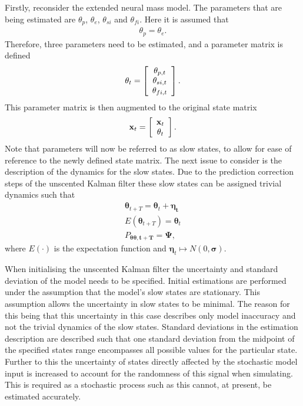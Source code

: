Firstly, reconsider the extended neural mass model. The parameters that are being estimated are $\theta_{p}$, $\theta_{e}$, $\theta_{si}$ and $\theta_{fi}$. Here it is assumed that \begin{align}
\theta_{p} = \theta_{e}.
\end{align} Therefore, three parameters need to be estimated, and a parameter matrix is defined
\[ \mathbf{\theta}_{t} = \left[ \begin{array}[pos]{c}
\theta_{p,t}\\
\theta_{si,t} \\
\theta_{fi,t} \end{array} \right] .\] This parameter matrix is then augmented to the original state matrix
\[ \mathbf{x}_{t} = \left[ \begin{array}[pos]{c}
\mathbf{x}_{t}\\
\mathbf{\theta}_{t} \end{array} \right] .\] Note that parameters will now be referred to as slow states, to allow for ease of reference to the newly defined state matrix. The next issue to consider is the description of the dynamics for the slow states. Due to the prediction correction steps of the unscented Kalman filter these slow states can be assigned trivial dynamics such that
\begin{align}
\label{eqn: parameterdynamics}
\mathbf{\theta}_{t+T} = \mathbf{\theta}_{t} + \mathbf{\eta_{t}}\\
E(\mathbf{\theta}_{t+T}) = \mathbf{\theta}_{t}\\
P_{\mathbf{\theta} \mathbf{\theta,t+T}} = \mathbf{\Psi},
\end{align} where $E(\cdot)$ is the expectation function and $\mathbf{\eta}_{t}\longmapsto N(0,\mathbf{\sigma})$.

When initialising the unscented Kalman filter the uncertainty and standard deviation of the model needs to be specified. Initial estimations are performed under the assumption that the model's slow states are stationary. This assumption allows the uncertainty in slow states to be minimal. The reason for this being that this uncertainty in this case describes only model inaccuracy and not the trivial dynamics of the slow states. Standard deviations in the estimation description are described such that one standard deviation from the midpoint of the specified states range encompasses all possible values for the particular state. Further to this the uncertainty of states directly affected by the stochastic model input is increased to account for the randomness of this signal when simulating. This is required as a stochastic process such as this cannot, at present, be estimated accurately. 

